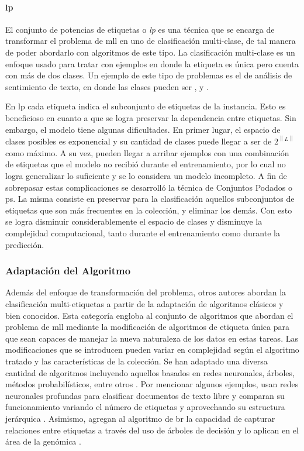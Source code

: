 \paragraph{\acrfull{lp}}

El conjunto de potencias de etiquetas o \textit{\acrlong{lp}}
\cite{tsoumakas_random_2011} es una técnica que se encarga de transformar el
problema de \acrshort{mll} en uno de clasificación multi-clase, de tal manera de
poder abordarlo con algoritmos de este tipo. La clasificación multi-clase es un
enfoque usado para tratar con ejemplos en donde la etiqueta es única pero cuenta
con más de dos clases. Un ejemplo de este tipo de problemas es el de análisis de
sentimiento de texto, en donde las clases pueden ser ,
 y . 

En \acrshort{lp} cada etiqueta indica el subconjunto de etiquetas de
la instancia. Esto es beneficioso en cuanto a que se logra preservar la
dependencia entre etiquetas. Sin embargo, el modelo tiene algunas dificultades.
En primer lugar, el espacio de clases posibles es exponencial y su cantidad de
clases puede llegar a ser de $2^{\left\|L\right\|}$ como máximo. A su vez, pueden
llegar a arribar ejemplos con una combinación de etiquetas que el modelo no
recibió durante el entrenamiento, por lo cual no logra generalizar lo suficiente
y se lo considera un modelo incompleto. A fin de sobrepasar estas complicaciones
se desarrolló la técnica de Conjuntos Podados o \acrfull{ps}. La misma consiste
en preservar para la clasificación aquellos subconjuntos de etiquetas que son
más frecuentes en la colección, y eliminar los demás. Con esto se logra
disminuir considerablemente el espacio de clases y disminuye la complejidad
computacional, tanto durante el entrenamiento como durante la predicción.

\subsubsection{Adaptación del Algoritmo}

Además del enfoque de transformación del problema, otros autores abordan la
clasificación multi-etiquetas a partir de la adaptación de algoritmos clásicos y
bien conocidos. Esta categoría engloba al conjunto de algoritmos que abordan el
problema de \acrshort{mll} mediante la modificación de algoritmos de etiqueta
única para que sean capaces de manejar la nueva naturaleza de los datos en estas
tareas. Las modificaciones que se introducen pueden variar en complejidad según
el algoritmo tratado y las características de la colección.  Se han adaptado una
diversa cantidad de algoritmos incluyendo aquellos basados en redes neuronales,
árboles, métodos probabilísticos, entre otros \cite{herrera_multilabel_2016}.
Por mencionar algunos ejemplos, \citeauthor{gargiulo_deep_2018} usan redes
neuronales profundas para clasificar documentos de texto libre y comparan su
funcionamiento variando el número de etiquetas y aprovechando su estructura
jerárquica \cite{gargiulo_deep_2018}. Asimismo,
\citeauthor{tanaka_multi-label_2015} agregan al algoritmo de \acrshort{br} la
capacidad de capturar relaciones entre etiquetas a través del uso de árboles de
decisión y lo aplican en el área de la genómica \cite{tanaka_multi-label_2015}.

